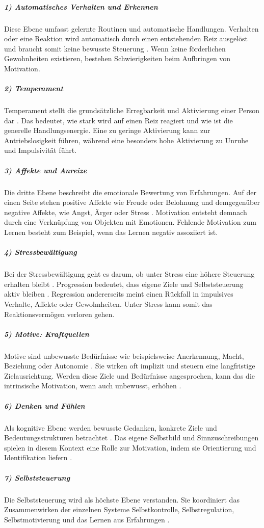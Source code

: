 \subparagraph{1) Automatisches Verhalten und Erkennen}
Diese Ebene umfasst gelernte Routinen und automatische Handlungen. Verhalten oder eine Reaktion wird automatisch durch einen entstehenden Reiz ausgelöst und braucht somit keine bewusste Steuerung \citep{kuhl2010lehrbuch,kuhlsieben}. Wenn keine förderlichen Gewohnheiten existieren, bestehen Schwierigkeiten beim Aufbringen von Motivation.

\subparagraph{2) Temperament}
Temperament stellt die grundsätzliche Erregbarkeit und Aktivierung einer Person dar \citep{kuhl2010lehrbuch}. Das bedeutet, wie stark wird auf einen Reiz reagiert und wie ist die generelle Handlungsenergie. Eine zu geringe Aktivierung kann zur Antriebslosigkeit führen, während eine besonders hohe Aktivierung zu Unruhe und Impulsivität führt.

\subparagraph{3) Affekte und Anreize}
Die dritte Ebene beschreibt die emotionale Bewertung von Erfahrungen. Auf der einen Seite stehen positive Affekte wie Freude oder Belohnung und demgegenüber negative Affekte, wie Angst, Ärger oder Stress \citep{kuhl2010lehrbuch}. Motivation entsteht demnach durch eine Verknüpfung von Objekten mit Emotionen. Fehlende Motivation zum Lernen besteht zum Beispiel, wenn das Lernen negativ assoziiert ist.

\subparagraph{4) Stressbewältigung}
Bei der Stressbewältigung geht es darum, ob unter Stress eine höhere Steuerung erhalten bleibt \citep{kuhlsieben}. Progression bedeutet, dass eigene Ziele und Selbststeuerung aktiv bleiben \citep{storch2007ressourcenorientiertes,kuhlsieben}. Regression andererseits meint einen Rückfall in impulsives Verhalte, Affekte oder Gewohnheiten. Unter Stress kann somit das Reaktionsvermögen verloren gehen.

\subparagraph{5) Motive: Kraftquellen}
Motive sind unbewusste Bedürfnisse wie beispielsweise Anerkennung, Macht, Beziehung oder Autonomie \citep{kuhl2010lehrbuch}. Sie wirken oft implizit und steuern eine langfristige Zielausrichtung. Werden diese Ziele und Bedürfnisse angesprochen, kann das die intrinsische Motivation, wenn auch unbewusst, erhöhen \citep{kuhlsieben}.

\subparagraph{6) Denken und Fühlen}
Als kognitive Ebene werden bewusste Gedanken, konkrete Ziele und Bedeutungsstrukturen betrachtet \citep{kuhl2010lehrbuch}. Das eigene Selbstbild und Sinnzuschreibungen spielen in diesem Kontext eine Rolle zur Motivation, indem sie Orientierung und Identifikation liefern \citep{kuhlsieben}.

\subparagraph{7) Selbststeuerung}
Die Selbststeuerung wird als höchste Ebene verstanden. Sie koordiniert das Zusammenwirken der einzelnen Systeme Selbstkontrolle, Selbstregulation, Selbstmotivierung und das Lernen aus Erfahrungen \citep{ritz2008personlichkeitsorientierte, kuhlsieben}.


